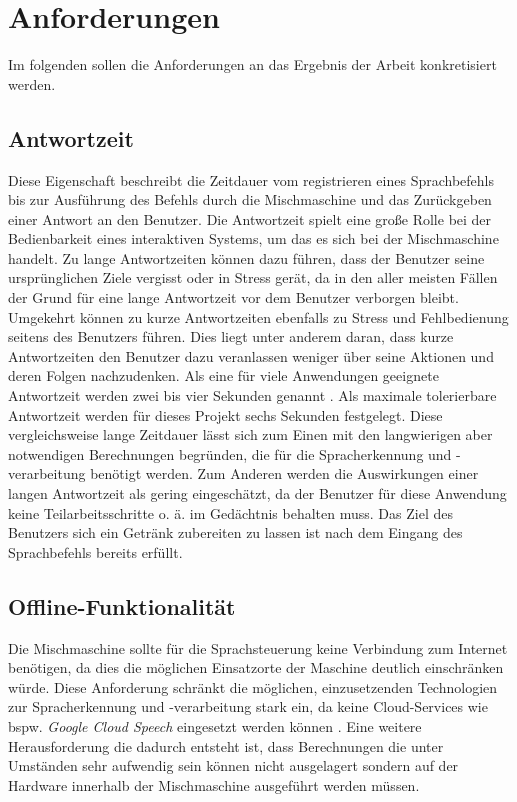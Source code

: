 \chapter{Anforderungen}
Im folgenden sollen die Anforderungen an das Ergebnis der Arbeit konkretisiert werden.
\section{Antwortzeit}
Diese Eigenschaft beschreibt die Zeitdauer vom registrieren eines Sprachbefehls bis zur Ausführung des Befehls durch die Mischmaschine und das Zurückgeben einer Antwort an den Benutzer. Die Antwortzeit spielt eine große Rolle bei der Bedienbarkeit eines interaktiven Systems, um das es sich bei der Mischmaschine handelt. Zu lange Antwortzeiten können dazu führen, dass der Benutzer seine ursprünglichen Ziele vergisst oder in Stress gerät, da in den aller meisten Fällen der Grund für eine lange Antwortzeit vor dem Benutzer verborgen bleibt. Umgekehrt können zu kurze Antwortzeiten ebenfalls zu Stress und Fehlbedienung seitens des Benutzers führen. Dies liegt unter anderem daran, dass kurze Antwortzeiten den Benutzer dazu veranlassen weniger über seine Aktionen und deren Folgen nachzudenken. Als eine für viele Anwendungen geeignete Antwortzeit werden zwei bis vier Sekunden genannt \cite{herczeg_9_2018}. Als maximale tolerierbare Antwortzeit werden für dieses Projekt sechs Sekunden festgelegt. Diese vergleichsweise lange Zeitdauer lässt sich zum Einen mit den langwierigen aber notwendigen Berechnungen begründen, die für die Spracherkennung und -verarbeitung benötigt werden. Zum Anderen werden die Auswirkungen einer langen Antwortzeit als gering eingeschätzt, da der Benutzer für diese Anwendung keine Teilarbeitsschritte o. ä. im Gedächtnis behalten muss. Das Ziel des Benutzers sich ein Getränk zubereiten zu lassen ist nach dem Eingang des Sprachbefehls bereits erfüllt.
\section{Offline-Funktionalität}
Die Mischmaschine sollte für die Sprachsteuerung keine Verbindung zum Internet benötigen, da dies die möglichen Einsatzorte der Maschine deutlich einschränken würde.  Diese Anforderung schränkt die möglichen, einzusetzenden Technologien zur Spracherkennung und -verarbeitung stark ein, da keine Cloud-Services wie bspw. \textit{Google Cloud Speech} eingesetzt werden können \cite{google_cloud_speech}. Eine weitere Herausforderung die dadurch entsteht ist, dass Berechnungen die unter Umständen sehr aufwendig sein können nicht ausgelagert sondern auf der Hardware innerhalb der Mischmaschine ausgeführt werden müssen.
